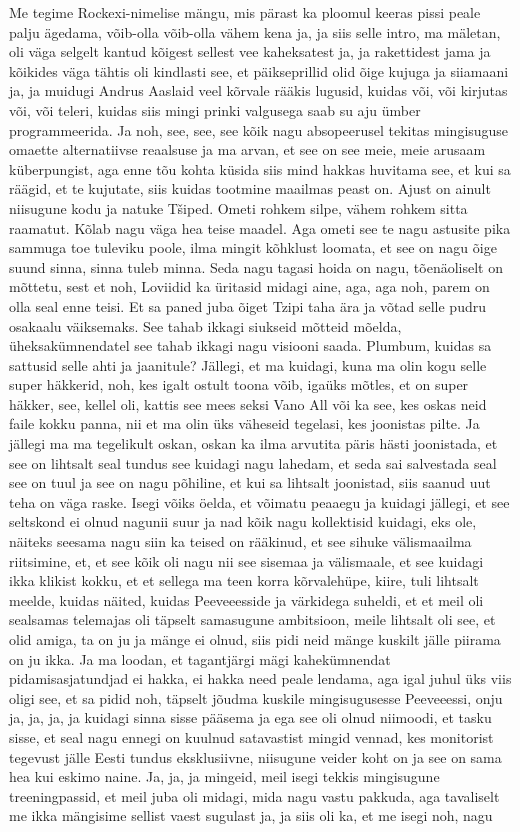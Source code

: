 Me tegime Rockexi-nimelise mängu, mis pärast ka ploomul keeras pissi peale palju ägedama, võib-olla võib-olla vähem kena ja, ja siis selle intro, ma mäletan, oli väga selgelt kantud kõigest sellest vee kaheksatest ja, ja rakettidest jama ja kõikides väga tähtis oli kindlasti see, et päikseprillid olid õige kujuga ja siiamaani ja, ja muidugi Andrus Aaslaid veel kõrvale rääkis lugusid, kuidas või, või kirjutas või, või teleri, kuidas siis mingi prinki valgusega saab su aju ümber programmeerida. Ja noh, see, see, see kõik nagu absopeerusel tekitas mingisuguse omaette alternatiivse reaalsuse ja ma arvan, et see on see meie, meie arusaam küberpungist, aga enne tõu kohta küsida siis mind hakkas huvitama see, et kui sa räägid, et te kujutate, siis kuidas tootmine maailmas peast on. Ajust on ainult niisugune kodu ja natuke Tšiped. Ometi rohkem silpe, vähem rohkem sitta raamatut. Kõlab nagu väga hea teise maadel. Aga ometi see te nagu astusite pika sammuga toe tuleviku poole, ilma mingit kõhklust loomata, et see on nagu õige suund sinna, sinna tuleb minna. Seda nagu tagasi hoida on nagu, tõenäoliselt on mõttetu, sest et noh, Loviidid ka üritasid midagi aine, aga, aga noh, parem on olla seal enne teisi. Et sa paned juba õiget Tzipi taha ära ja võtad selle pudru osakaalu väiksemaks. See tahab ikkagi siukseid mõtteid mõelda, üheksakümnendatel see tahab ikkagi nagu visiooni saada. Plumbum, kuidas sa sattusid selle ahti ja jaanitule? Jällegi, et ma kuidagi, kuna ma olin kogu selle super häkkerid, noh, kes igalt ostult toona võib, igaüks mõtles, et on super häkker, see, kellel oli, kattis see mees seksi Vano All või ka see, kes oskas neid faile kokku panna, nii et ma olin üks väheseid tegelasi, kes joonistas pilte. Ja jällegi ma ma tegelikult oskan, oskan ka ilma arvutita päris hästi joonistada, et see on lihtsalt seal tundus see kuidagi nagu lahedam, et seda sai salvestada seal see on tuul ja see on nagu põhiline, et kui sa lihtsalt joonistad, siis saanud uut teha on väga raske. Isegi võiks öelda, et võimatu peaaegu ja kuidagi jällegi, et see seltskond ei olnud nagunii suur ja nad kõik nagu kollektisid kuidagi, eks ole, näiteks seesama nagu siin ka teised on rääkinud, et see sihuke välismaailma riitsimine, et, et see kõik oli nagu nii see sisemaa ja välismaale, et see kuidagi ikka klikist kokku, et et sellega ma teen korra kõrvalehüpe, kiire, tuli lihtsalt meelde, kuidas näited, kuidas Peeveeesside ja värkidega suheldi, et et meil oli sealsamas telemajas oli täpselt samasugune ambitsioon, meile lihtsalt oli see, et olid amiga, ta on ju ja mänge ei olnud, siis pidi neid mänge kuskilt jälle piirama on ju ikka. Ja ma loodan, et tagantjärgi mägi kahekümnendat pidamisasjatundjad ei hakka, ei hakka need peale lendama, aga igal juhul üks viis oligi see, et sa pidid noh, täpselt jõudma kuskile mingisugusesse Peeveeessi, onju ja, ja, ja, ja kuidagi sinna sisse pääsema ja ega see oli olnud niimoodi, et tasku sisse, et seal nagu ennegi on kuulnud satavastist mingid vennad, kes monitorist tegevust jälle Eesti tundus eksklusiivne, niisugune veider koht on ja see on sama hea kui eskimo naine. Ja, ja, ja mingeid, meil isegi tekkis mingisugune treeningpassid, et meil juba oli midagi, mida nagu vastu pakkuda, aga tavaliselt me ikka mängisime sellist vaest sugulast ja, ja siis oli ka, et me isegi noh, nagu 